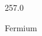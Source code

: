 \documentclass[12pt]{article}
\begin{document}
\hfill{}
\vfill
\begin{center}
  {\fontsize{50}{60}
  }

  257.0

Fermium
\end{center}
\vfill
\end{document}
